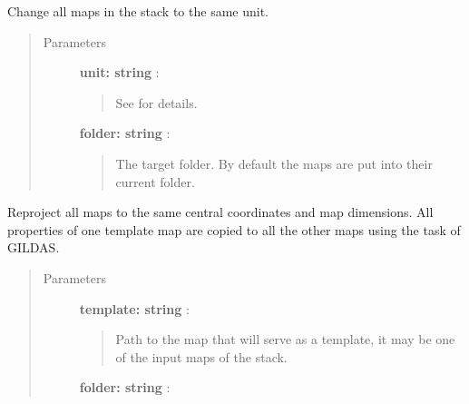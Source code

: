 \documentclass[a4paper,10pt,english]{sphinxmanual}
\begin{document}
\begin{fulllineitems}
\begin{fulllineitems}
\end{fulllineitems}


\begin{fulllineitems}
\label{maps:astrolyze.maps.stack.Stack.unify_units}
Change all maps in the stack to the same unit.
\begin{quote}\begin{description}
\item[{Parameters }] \leavevmode
\textbf{unit: string} :
\begin{quote}

See 
for details.
\end{quote}

\textbf{folder: string} :
\begin{quote}

The target folder. By default the maps
are put into their current folder.
\end{quote}

\end{description}\end{quote}

\end{fulllineitems}


\begin{fulllineitems}
\label{maps:astrolyze.maps.stack.Stack.unify_dimensions}
Reproject all maps to the same central coordinates and map
dimensions.  All properties of one template map are copied to all the
other maps using the  task of GILDAS.
\begin{quote}\begin{description}
\item[{Parameters }] \leavevmode
\textbf{template: string} :
\begin{quote}

Path to the map that will serve as a template, it may be one of
the input maps of the stack.
\end{quote}

\textbf{folder: string} :
\begin{quote}


\end{quote}
\end{description}
\end{quote}
\end{fulllineitems}
\end{fulllineitems}
\end{document}
